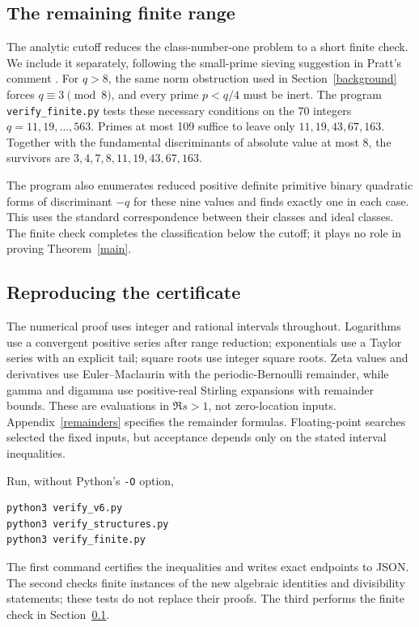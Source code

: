 \documentclass[11pt]{article}
\begin{document}
\subsection{The remaining finite range}\label{finite}
The analytic cutoff reduces the class-number-one problem to a short
finite check. We include it separately, following the small-prime
sieving suggestion in Pratt's comment \cite{prattsieve}.
For \(q>8\), the same norm obstruction used in
Section~\ref{background} forces \(q\equiv3\pmod8\), and every
prime \(p<q/4\) must be inert. The program \texttt{verify\_finite.py}
tests these necessary conditions on the 70 integers
\(q=11,19,\ldots,563\). Primes at most 109 suffice to leave
only \(11,19,43,67,163\). Together with the fundamental
discriminants of absolute value at most 8, the survivors are
\(3,4,7,8,11,19,43,67,163\).

The program also enumerates reduced positive definite primitive binary
quadratic forms of discriminant \(-q\) for these nine values and
finds exactly one in each case. This uses the standard correspondence
between their classes and ideal classes. The finite check completes
the classification below the cutoff; it plays no role in proving
Theorem~\ref{main}.

\subsection{Reproducing the certificate}
The numerical proof uses integer and rational intervals throughout.
Logarithms use a convergent positive series after range reduction;
exponentials use a Taylor series with an explicit tail; square roots
use integer square roots. Zeta values and derivatives use
Euler--Maclaurin with the periodic-Bernoulli remainder, while gamma
and digamma use positive-real Stirling expansions with remainder
bounds. These are evaluations in \(\Re s>1\), not zero-location
inputs. Appendix~\ref{remainders} specifies the remainder formulas.
Floating-point searches selected the fixed inputs, but acceptance
depends only on the stated interval inequalities.

Run, without Python's \texttt{-O} option,
\begin{verbatim}
python3 verify_v6.py
python3 verify_structures.py
python3 verify_finite.py
\end{verbatim}
The first command certifies the inequalities and writes exact
endpoints to JSON. The second checks finite instances of the new
algebraic identities and divisibility statements; these tests do not
replace their proofs. The third performs the finite check in
Section~\ref{finite}.
\end{document}
